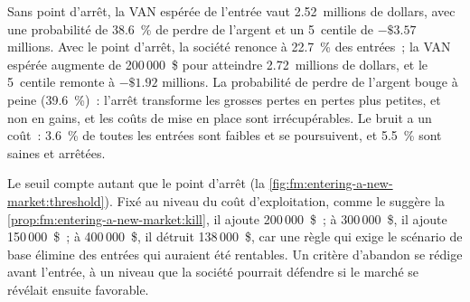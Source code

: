 Sans point d'arrêt, la VAN espérée de l'entrée vaut 2.52~millions de dollars, avec une probabilité de 38.6~\% de perdre de l'argent et un 5~centile de $-\$3.57$ millions. Avec
le point d'arrêt, la société renonce à 22.7~\% des entrées~; la VAN espérée augmente de 200\,000~\$ pour atteindre 2.72~millions de dollars, et le 5~centile remonte à $-\$1.92$
millions. La probabilité de perdre de l'argent bouge à peine (39.6~\%)~: l'arrêt transforme les grosses pertes en pertes plus petites, et non en gains, et les
coûts de mise en place sont irrécupérables. Le bruit a un coût~: 3.6~\% de toutes les entrées sont faibles et se poursuivent, et 5.5~\% sont saines et arrêtées.

\begin{omfigure}

\label{fig:fm:entering-a-new-market:threshold}
\end{omfigure}

Le seuil compte autant que le point d'arrêt (la \cref{fig:fm:entering-a-new-market:threshold}). Fixé au niveau du coût d'exploitation, comme
le suggère la \cref{prop:fm:entering-a-new-market:kill}, il ajoute 200\,000~\$~; à 300\,000~\$, il ajoute 150\,000~\$~; à 400\,000~\$, il détruit 138\,000~\$,
car une règle qui exige le scénario de base élimine des entrées qui auraient été rentables. Un critère d'abandon se rédige avant l'entrée, à un niveau que la société pourrait
défendre si le marché se révélait ensuite favorable.

